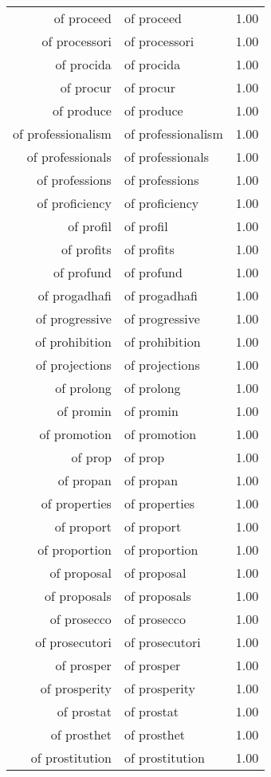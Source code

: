 \begin{table}[ht]
\begin{tabular}{rlr}
  of proceed & of proceed & 1.00 \\ 
  of processori & of processori & 1.00 \\ 
  of procida & of procida & 1.00 \\ 
  of procur & of procur & 1.00 \\ 
  of produce & of produce & 1.00 \\ 
  of professionalism & of professionalism & 1.00 \\ 
  of professionals & of professionals & 1.00 \\ 
  of professions & of professions & 1.00 \\ 
  of proficiency & of proficiency & 1.00 \\ 
  of profil & of profil & 1.00 \\ 
  of profits & of profits & 1.00 \\ 
  of profund & of profund & 1.00 \\ 
  of progadhafi & of progadhafi & 1.00 \\ 
  of progressive & of progressive & 1.00 \\ 
  of prohibition & of prohibition & 1.00 \\ 
  of projections & of projections & 1.00 \\ 
  of prolong & of prolong & 1.00 \\ 
  of promin & of promin & 1.00 \\ 
  of promotion & of promotion & 1.00 \\ 
  of prop & of prop & 1.00 \\ 
  of propan & of propan & 1.00 \\ 
  of properties & of properties & 1.00 \\ 
  of proport & of proport & 1.00 \\ 
  of proportion & of proportion & 1.00 \\ 
  of proposal & of proposal & 1.00 \\ 
  of proposals & of proposals & 1.00 \\ 
  of prosecco & of prosecco & 1.00 \\ 
  of prosecutori & of prosecutori & 1.00 \\ 
  of prosper & of prosper & 1.00 \\ 
  of prosperity & of prosperity & 1.00 \\ 
  of prostat & of prostat & 1.00 \\ 
  of prosthet & of prosthet & 1.00 \\ 
  of prostitution & of prostitution & 1.00 \\ 

\end{tabular}
\end{table}
